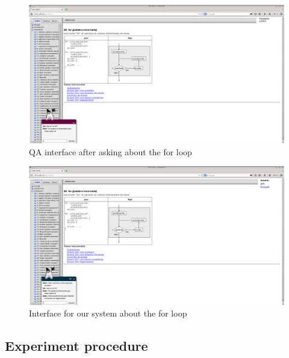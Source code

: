 \begin{figure}[!htbp]
    \centering
    \includegraphics[width=\textwidth]{img/test/qa-client2.png}
    \caption{QA interface after asking about the for loop}
    \label{fig:qa-client-for}
\end{figure}
\begin{figure}[!htbp]
    \centering
    \includegraphics[width=\textwidth]{img/test/ask-client.png}
    \caption{Interface for our system about the for loop}
    \label{fig:ask-client-for}
\end{figure}

\subsection{Experiment procedure}

